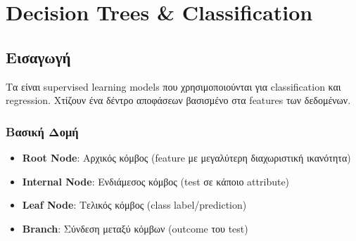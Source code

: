 
\chapter{Decision Trees \& Classification}

\section{Εισαγωγή}

Τα  είναι supervised learning models που χρησιμοποιούνται για classification και regression. Χτίζουν ένα δέντρο αποφάσεων βασισμένο στα features των δεδομένων.

\subsection{Βασική Δομή}

\begin{center}
\end{center}

\begin{definitionbox}
\begin{itemize}
    \item \textbf{Root Node}: Αρχικός κόμβος (feature με μεγαλύτερη διαχωριστική ικανότητα)
    \item \textbf{Internal Node}: Ενδιάμεσος κόμβος (test σε κάποιο attribute)
    \item \textbf{Leaf Node}: Τελικός κόμβος (class label/prediction)
    \item \textbf{Branch}: Σύνδεση μεταξύ κόμβων (outcome του test)
\end{itemize}
\end{definitionbox}

